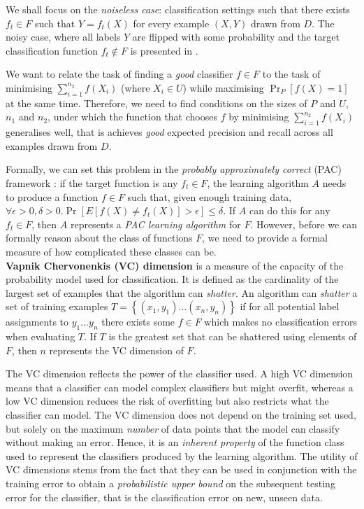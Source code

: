 \documentclass[12pt,twoside,notitlepage,amsart]{report} %
\begin{document}
	We shall focus on the \emph{noiseless case}: classification settings such that there exists $f_t \in F$ such that $Y = f_t(X)$ for every example $(X,Y)$ drawn from $D$. The noisy case, where all labels $Y$ are flipped with some probability and the target classification function $f_t \notin F$ is presented in \cite{Liu02}. 
	 
	We want to relate the task of finding a \emph{good} classifier $f \in F$ to the task of minimising $\sum_{i=1}^{n_2}{f(X_i)}$ (where $X_i \in U$) while maximising $\Pr_{P}[f(X)=1]$ at the same time. Therefore, we need to find conditions on the sizes of $P$ and $U$, $n_1$ and $n_2$, under which the function that chooses $f$ by minimising $\sum_{i=1}^{n_2}{f(X_i)}$ generalises well, that is achieves \emph{good} expected precision and recall across all examples drawn from $D$. 
	
	Formally, we can set this problem in the \emph{probably approximately correct} (PAC) framework \cite{Valiant84}: if the target function is any $f_t \in F$, the learning algorithm $A$ needs to produce a function $f \in F$ such that, given enough training data, $\forall \epsilon>0, \delta>0. \Pr[E[f(X) \neq f_t(X)] > \epsilon] \leq \delta$. If $A$ can do this for any $ f_{t} \in F$, then $A$ represents a \emph{PAC learning algorithm} for $F$. However, before we can formally reason about the class of functions $F$, we need to provide a formal measure of how complicated these classes can be. \\
	
	\textbf{Vapnik Chervonenkis (VC) dimension} is a measure of the capacity of the probability model used for classification. It is defined as the cardinality of the largest set of examples that the algorithm can \emph{shatter}. An algorithm can \emph{shatter} a set of training examples $ T = \left\{ (x_1, y_1) \ldots (x_n, y_n) \right\} $ if for all potential label assignments to $y_1 \ldots y_n$ there exists some $f \in F$ which makes no classification errors when evaluating $T$. If $T$ is the greatest set that can be shattered using elements of $F$, then $n$ represents the VC dimension of $F$. 
	
	The VC dimension reflects the power of the classifier used. A high VC dimension means that a classifier can model complex classifiers but might overfit, whereas a low VC dimension reduces the risk of overfitting but also restricts what the classifier can model. The VC dimension does not depend on the training set used, but solely on the maximum \emph{number} of data points that the model can classify without making an error. Hence, it is an \emph{inherent property} of the function class used to represent the classifiers produced by the learning algorithm. The utility of VC dimensions stems from the fact that they can be used in conjunction with the training error %
	to obtain a \emph{probabilistic upper bound} on the subsequent testing error for the classifier, that is the classification error on new, unseen data. \cite{Vapnik71}  
	
\end{document}
